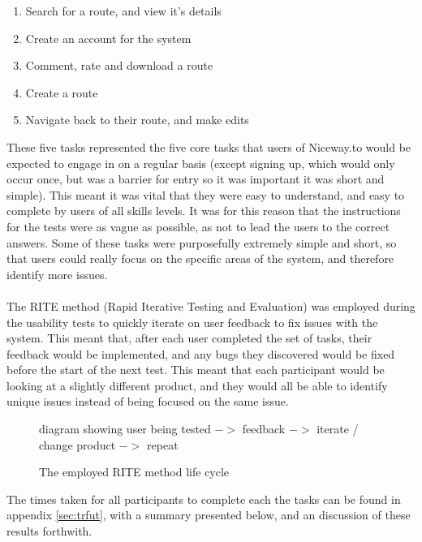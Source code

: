 \begin{enumerate}
	\item Search for a route, and view it's details
	\item Create an account for the system
	\item Comment, rate and download a route 
	\item Create a route
	\item Navigate back to their route, and make edits
\end{enumerate}
\noindent 
These five tasks represented the five core tasks that users of Niceway.to would be expected to engage in on a regular basis (except signing up, which would only occur once, but was a barrier for entry so it was important it was short and simple). This meant it was vital that they were easy to understand, and easy to complete by users of all skills levels. It was for this reason that the instructions for the tests were as vague as possible, as not to lead the users to the correct answers. Some of these tasks were purposefully extremely simple and short, so that users could really focus on the specific areas of the system, and therefore identify more issues.\ \\
\ \\
The RITE method (Rapid Iterative Testing and Evaluation) was employed during the usability tests to quickly iterate on user feedback to fix issues with the system. This meant that, after each user completed the set of tasks, their feedback would be implemented, and any bugs they discovered would be fixed before the start of the next test. This meant that each participant would be looking at a slightly different product, and they would all be able to identify unique issues instead of being focused on the same issue.

\begin{figure}[!ht]
	\begin{center}
	\end{center}
		{\color{red}
			diagram showing user being tested $->$ feedback $->$ iterate / change product $->$ repeat
		}
	\vspace{-3mm}
	\caption{The employed RITE method life cycle}	
\end{figure}

\newpage
\noindent
The times taken for all participants to complete each the tasks can be found in appendix \ref{sec:trfut}, with a summary presented below, and an discussion of these results forthwith.

